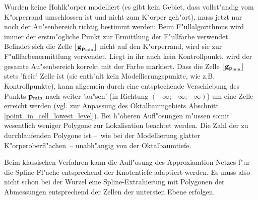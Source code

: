 Wurden keine Hohlk"orper modelliert (es gibt kein Gebiet, dass vollst"andig 
vom K"orperrand umschlossen ist und nicht zum K"orper geh"ort), muss jetzt nur 
noch der Au"senbereich richtig bestimmt werden:
Beim F"ullalgorithmus wird immer der erstm"ogliche Punkt zur Ermittlung 
der F"ullfarbe verwendet. Befindet sich die 
Zelle ${ \left\lfloor { {\bf g}_{{\bf p}_{\min}} } \right\rfloor }$ nicht auf den K"orperrand, wird sie 
zur F"ullfarbenermittlung verwendet. Liegt in ihr auch kein Kontrollpunkt, 
wird der gesamte Au"senbereich korrekt mit der Farbe  
markiert. Dass die Zelle ${ \left\lfloor { {\bf g}_{{\bf p}_{\min}} } \right\rfloor }$ stets 'freie' 
Zelle ist (sie enth"alt kein Modellierungspunkte, wie z.B. Kontrollpunkte), 
kann allgemein durch eine entsptechende Verschiebung des 
Punkts ${\bf p}_{\min}$ nach weiter 'au"sen' (in Richtung 
$(-\infty; -\infty; -\infty)$) um eine Zelle erreicht werden (vgl. zur 
Anpassung des Oktalbaumgebiets Abschnitt \ref{point_in_cell_lowest_level}). 
Bei h"oheren Aufl"osungen m"ussen somit wesentlich weniger Polygone zur 
Lokalisation beachtet werden. Die Zahl der zu durchlaufenden Polygone ist 
--~wie bei der Modellierung glatter K"orperoberfl"achen~-- unabh"angig von 
der Oktalbaumtiefe. 

Beim klassischen Verfahren kann die Aufl"osung des Approxiamtion-Netzes f"ur 
die Spline-Fl"ache entsprechend der Knotentiefe adaptiert werden. Es muss 
also nicht schon bei der Wurzel eine Spline-Extrahierung mit Polygonen der 
Abmessungen entsprechend der Zellen der untersten Ebene erfolgen. 

